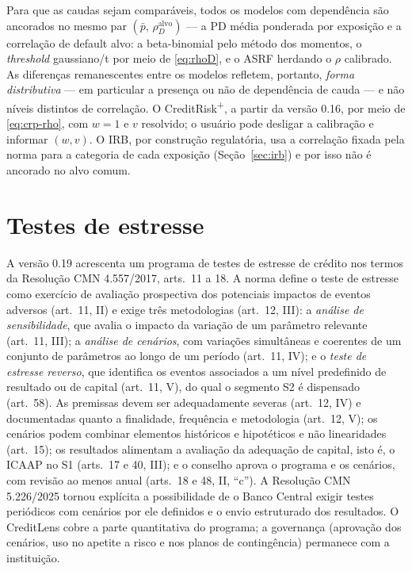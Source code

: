 \documentclass[11pt,a4paper]{article}
\begin{document}
Para que as caudas sejam comparáveis, todos os modelos com dependência são ancorados no mesmo par $(\bar p,\, \rho_D^{\mathrm{alvo}})$ --- a PD média ponderada por exposição e a correlação de default alvo: a beta-binomial pelo método dos momentos, o \emph{threshold} gaussiano/t por meio de \eqref{eq:rhoD}, e o ASRF herdando o $\rho$ calibrado. As diferenças remanescentes entre os modelos refletem, portanto, \emph{forma distributiva} --- em particular a presença ou não de dependência de cauda --- e não níveis distintos de correlação. O CreditRisk\textsuperscript{+}, a partir da versão 0.16, por meio de \eqref{eq:crp-rho}, com $w=1$ e $v$ resolvido; o usuário pode desligar a calibração e informar $(w,v)$. O IRB, por construção regulatória, usa a correlação fixada pela norma para a categoria de cada exposição (Seção~\ref{sec:irb}) e por isso não é ancorado no alvo comum.

\section{Testes de estresse}
\label{sec:estresse}

A versão 0.19 acrescenta um programa de testes de estresse de crédito nos termos da Resolução CMN 4.557/2017, arts.~11 a 18. A norma define o teste de estresse como exercício de avaliação prospectiva dos potenciais impactos de eventos adversos (art.~11, II) e exige três metodologias (art.~12, III): a \emph{análise de sensibilidade}, que avalia o impacto da variação de um parâmetro relevante (art.~11, III); a \emph{análise de cenários}, com variações simultâneas e coerentes de um conjunto de parâmetros ao longo de um período (art.~11, IV); e o \emph{teste de estresse reverso}, que identifica os eventos associados a um nível predefinido de resultado ou de capital (art.~11, V), do qual o segmento S2 é dispensado (art.~58). As premissas devem ser adequadamente severas (art.~12, IV) e documentadas quanto a finalidade, frequência e metodologia (art.~12, V); os cenários podem combinar elementos históricos e hipotéticos e não linearidades (art.~15); os resultados alimentam a avaliação da adequação de capital, isto é, o ICAAP no S1 (arts.~17 e 40, III); e o conselho aprova o programa e os cenários, com revisão ao menos anual (arts.~18 e 48, II, ``c''). A Resolução CMN 5.226/2025 tornou explícita a possibilidade de o Banco Central exigir testes periódicos com cenários por ele definidos e o envio estruturado dos resultados. O CreditLens cobre a parte quantitativa do programa; a governança (aprovação dos cenários, uso no apetite a risco e nos planos de contingência) permanece com a instituição.
\end{document}
